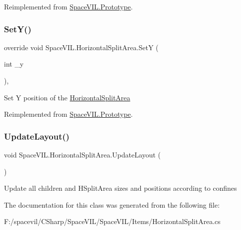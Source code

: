 Reimplemented from \mbox{\hyperlink{class_space_v_i_l_1_1_prototype_ae96644a6ace490afb376fb542161e541}{Space\+V\+I\+L.\+Prototype}}.

\mbox{\label{class_space_v_i_l_1_1_horizontal_split_area_a49f19dd9999b4ab40def3b69b2682973}} 
\subsubsection{\texorpdfstring{Set\+Y()}{SetY()}}
{\footnotesize\ttfamily override void Space\+V\+I\+L.\+Horizontal\+Split\+Area.\+SetY (\begin{DoxyParamCaption}\item[{int}]{\+\_\+y }\end{DoxyParamCaption})\hspace{0.3cm}{\ttfamily [inline]}, {\ttfamily [virtual]}}



Set Y position of the \mbox{\hyperlink{class_space_v_i_l_1_1_horizontal_split_area}{Horizontal\+Split\+Area}} 



Reimplemented from \mbox{\hyperlink{class_space_v_i_l_1_1_prototype}{Space\+V\+I\+L.\+Prototype}}.

\mbox{\label{class_space_v_i_l_1_1_horizontal_split_area_a17787a6998374e9fea24a7a7a466be42}} 
\subsubsection{\texorpdfstring{Update\+Layout()}{UpdateLayout()}}
{\footnotesize\ttfamily void Space\+V\+I\+L.\+Horizontal\+Split\+Area.\+Update\+Layout (\begin{DoxyParamCaption}{ }\end{DoxyParamCaption})\hspace{0.3cm}{\ttfamily [inline]}}



Update all children and H\+Split\+Area sizes and positions according to confines 



The documentation for this class was generated from the following file\+:\begin{DoxyCompactItemize}
\item 
F\+:/spacevil/\+C\+Sharp/\+Space\+V\+I\+L/\+Space\+V\+I\+L/\+Items/Horizontal\+Split\+Area.\+cs\end{DoxyCompactItemize}
